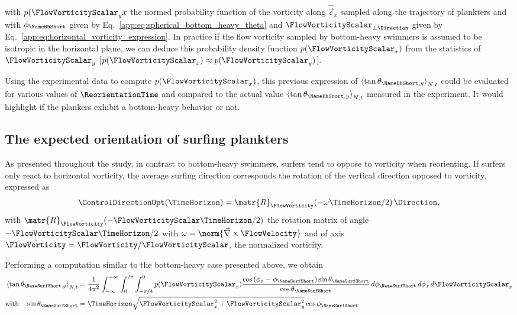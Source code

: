 with $p(\FlowVorticityScalar_yx$ the normed probability function of the vorticity along $\hat{\vec{e}}_x$ sampled along the trajectory of plankters and with $\phi_{\mathrm{\NameBhShort}}$ given by Eq.~\eqref{app:eq:spherical_bottom_heavy_theta} and $\FlowVorticityScalar_{\perp \Direction}$ given by Eq.~\eqref{app:eq:horizontal_vorticity_expression}.
In practice if the flow vorticity sampled by bottom-heavy swimmers is assumed to be isotropic in the horizontal plane, we can deduce this probability density function $p(\FlowVorticityScalar_x)$ from the statistics of $\FlowVorticityScalar_{y}$ [$p(\FlowVorticityScalar_x) \approx p(\FlowVorticityScalar_y)$].

Using the experimental data to compute $p(\FlowVorticityScalar_x)$, this previous expression of $\left\langle \tan \theta_{\mathrm{\NameBhShort}, y} \right\rangle_{N, t}$ could be evaluated for various values of $\ReorientationTime$ and compared to the actual value $\left\langle \tan \theta_{\mathrm{\NameBhShort}, y} \right\rangle_{N, t}$ measured in the experiment.
It would highlight if the plankers exhibit a bottom-heavy behavior or not.

\subsection{The expected orientation of surfing plankters}

As presented throughout the study, in contrast to bottom-heavy swimmers, surfers tend to oppose to vorticity when reorienting.
If surfers only react to horizontal vorticity, the average surfing direction corresponds the rotation of the vertical direction opposed to vorticity, expressed as
\begin{equation}
	\ControlDirectionOpt(\TimeHorizon) = \matr{R}_{\hat{\FlowVorticity}}(-\omega \TimeHorizon/2) \, \Direction,
\end{equation}
with $\matr{R}_{\hat{\FlowVorticity}}(-\FlowVorticityScalar \TimeHorizon/2)$ the rotation matrix of angle $-\FlowVorticityScalar \TimeHorizon/2$ with $\omega = \norm{\vec{\nabla} \times \FlowVelocity}$ and of axis $\hat{\FlowVorticity} = \FlowVorticity/\FlowVorticityScalar$, the normalized vorticity.

Performing a computation similar to the bottom-heavy case presented above, we obtain
\begin{subequations}
	\begin{align}
		\left\langle \tan \theta_{\mathrm{\NameSurfShort}, y} \right\rangle_{N, t} &= \frac{1}{4 \pi^2} \int_{-\infty}^{+\infty} \int_0^{2\pi} \int_{-\pi/4}^{0} p(\FlowVorticityScalar_x) \frac{\cos \left( \phi_{x} - \phi_{\mathrm{\NameSurfShort}} \right) \sin \theta_{\mathrm{\NameSurfShort}}}{\cos \theta_{\mathrm{\NameSurfShort}}} \, d \phi_{\mathrm{\NameSurfShort}} \, d\phi_{x} \, d\FlowVorticityScalar_x\\
		\text{with} \quad \sin \theta_{\mathrm{\NameSurfShort}} &= \TimeHorizon \sqrt{\FlowVorticityScalar_{x}^2 + \FlowVorticityScalar_{y}^2} \cos \phi_{\mathrm{\NameSurfShort}}
	\end{align}
\end{subequations}


